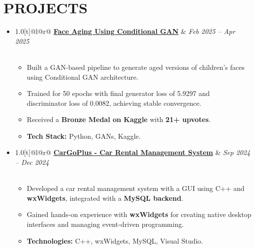 \documentclass[letterpaper,10pt]{article}
\newcommand{\resumeSubHeadingListStart}{\begin{itemize}[leftmargin=0.15in,label={}]}
\newcommand{\resumeSubHeadingListEnd}{\end{itemize}}
\newcommand{\resumeItemListStart}{\begin{itemize}[leftmargin=12pt]}
\newcommand{\resumeItemListEnd}{\end{itemize}}
\newcommand{\resumeItem}[1]{\item\small{#1}}
\begin{document}
\section{PROJECTS}
\vspace{5 pt}
\resumeSubHeadingListStart

  \item
  \begin{tabular*}{1.0\textwidth}[t]{@{}l@{\extracolsep{\fill}}r@{}}
    \textbf{\large{\underline{Face Aging Using Conditional GAN}}} & \textit{Feb 2025 -- Apr 2025} \\
     \\
  \end{tabular*}
  \resumeItemListStart
      \resumeItem{Built a GAN-based pipeline to generate aged versions of children's faces using Conditional GAN architecture.}
      \resumeItem{Trained for 50 epochs with final generator loss of 5.9297 and discriminator loss of 0.0082, achieving stable convergence.}
      \resumeItem{Received a \textbf{Bronze Medal on Kaggle} with \textbf{21+ upvotes}.}
      \resumeItem{\textbf{Tech Stack:} Python, GANs, Kaggle.}
  \resumeItemListEnd
  \vspace{5pt}

  \item
  \begin{tabular*}{1.0\textwidth}[t]{@{}l@{\extracolsep{\fill}}r@{}}
    \textbf{\large{\underline{CarGoPlus - Car Rental Management System}}} & \textit{Sep 2024 -- Dec 2024} \\
     \\
  \end{tabular*}
  \resumeItemListStart
      \resumeItem{Developed a car rental management system with a GUI using C++ and \textbf{wxWidgets}, integrated with a \textbf{MySQL backend}.}
      \resumeItem{Gained hands-on experience with \textbf{wxWidgets} for creating native desktop interfaces and managing event-driven programming.}
      \resumeItem{\textbf{Technologies:} C++, wxWidgets, MySQL, Visual Studio.}
  \resumeItemListEnd
  \vspace{5pt}

\resumeSubHeadingListEnd



\end{document}
